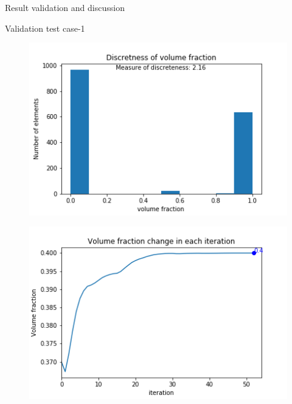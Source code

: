 \documentclass[a4paper,12pt,times]{article}
\begin{document}
\begin{section}{Result validation and discussion}
\begin{subsection}{Validation test case-1}
\begin{figure}[H]
\label{VC-01.4}
\end{figure}
\begin{figure}[H]
	\centering
	\begin{minipage}{.5\textwidth}
		\centering
		\includegraphics[width=1\linewidth]{MMA_01_discretness.png}
		\label{VC-01.5}
	\end{minipage}%
	\begin{minipage}{.5\textwidth}
		\centering
		\includegraphics[width=1\linewidth]{MMA_01_Volume_fractionVSiteration.png}
		\label{VC-01.6}
	\end{minipage}
\end{figure} 

\end{subsection}
\end{section}
\end{document}
